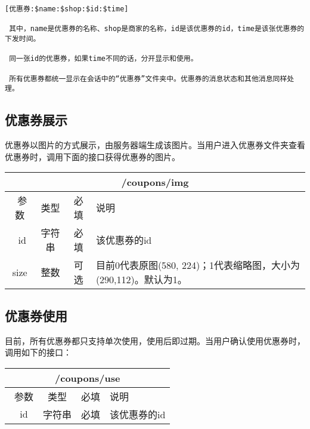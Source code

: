 \begin{verbatim}
[优惠券:$name:$shop:$id:$time]

 其中，name是优惠券的名称、shop是商家的名称，id是该优惠券的id，time是该张优惠券的下发时间。
 
 同一张id的优惠券，如果time不同的话，分开显示和使用。
 
 所有优惠券都统一显示在会话中的“优惠券”文件夹中。优惠券的消息状态和其他消息同样处理。
\end{verbatim}

\subsection{优惠券展示}
优惠券以图片的方式展示，由服务器端生成该图片。当用户进入优惠券文件夹查看优惠券时，调用下面的接口获得优惠券的图片。

\begin{table}[H]
   \begin{center}
\begin{tabular}{|c|c|c|p{12cm}|}
\hline
\multicolumn{4}{|c|}{/coupons/img} \\
\hline\hline
 \  参数  & 类型 & 必填 &  说明  \\
\hline
 \  id  & 字符串 & 必填 &  该优惠券的id  \\
\hline
 size  & 整数 & 可选 &  目前0代表原图(580, 224)；1代表缩略图，大小为(290,112)。默认为1。\\ 
\hline
\end{tabular}
   \end{center}
\end{table}



\subsection{优惠券使用}
目前，所有优惠券都只支持单次使用，使用后即过期。当用户确认使用优惠券时，调用如下的接口：
\begin{table}[H]
   \begin{center}
\begin{tabular}{|c|c|c|p{12cm}|}
\hline
\multicolumn{4}{|c|}{/coupons/use} \\
\hline\hline
 \  参数  & 类型 & 必填 &  说明  \\
\hline
 \  id  & 字符串 & 必填 &  该优惠券的id  \\
\hline
\end{tabular}
   \end{center}
\end{table}

